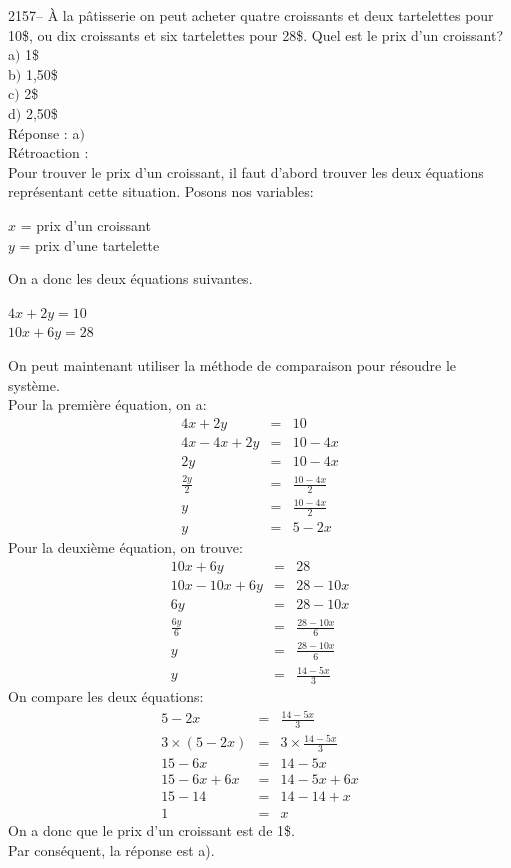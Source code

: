 \documentclass[letterpaper, 12pt]{article}
\begin{document}
2157-- \`A la p\^atisserie on peut acheter quatre croissants et deux tartelettes pour 10\$, ou dix croissants et six tartelettes pour 28\$. Quel est le prix d'un croissant? \\

a$)$ 1\$ \\
b$)$ 1,50\$ \\
c$)$ 2\$ \\
d$)$ 2,50\$ \\

R\'eponse : a$)$\\

R\'etroaction :\\
Pour trouver le prix d'un croissant, il  faut d'abord trouver les deux \'equations repr\'esentant cette situation. Posons nos variables:
\begin{center}
 $x$ = prix d'un croissant\\
$y$ = prix d'une tartelette\\
\end{center}
On a donc les deux \'equations suivantes.
\begin{center}
$4x+2y=10$ \\
$10x+6y=28$\\
\end{center}
On peut maintenant utiliser la m\'ethode de comparaison pour r\'esoudre le syst\`eme.\\
Pour la premi\`ere \'equation, on a:
\begin{eqnarray*}
 4x+2y&=&10\\
4x-4x+2y&=&10-4x\\
2y&=&10-4x\\[2mm]
\frac{2y}{2}&=&\frac{10-4x}{2}\\[2mm]
y&=&\frac{10-4x}{2}\\
y&=&5-2x
\end{eqnarray*}
Pour la deuxi\`eme \'equation, on trouve:
\begin{eqnarray*}
 10x+6y&=&28\\
10x-10x+6y&=&28-10x\\
6y&=&28-10x\\[2mm]
\frac{6y}{6}&=&\frac{28-10x}{6}\\[2mm]
y&=&\frac{28-10x}{6}\\
y&=&\frac{14-5x}{3}
\end{eqnarray*}
On compare les deux \'equations:
\begin{eqnarray*}
5-2x&=&\frac{14-5x}{3}\\[2mm]
3\times (5-2x) &=& 3 \times \frac{14-5x}{3}\\
15-6x &=& 14-5x\\
15-6x+6x &=& 14-5x+6x\\
15-14 &=& 14-14+x\\
1 &=& x
\end{eqnarray*}
On a donc que le prix d'un croissant est de 1\$. \\
Par cons\'equent, la r\'eponse est a).\\
\end{document}
